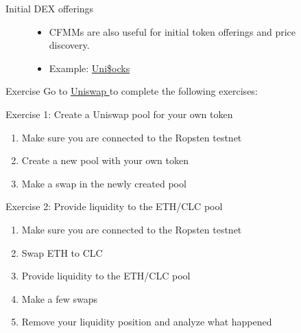 \documentclass[]{beamer}
\begin{document}
\begin{frame}{Initial DEX offerings}

	\begin{figure}
		\begin{minipage}[c]{0.3\textwidth}
			
		\end{minipage}
		\hfill
		\begin{minipage}[c]{0.5\textwidth}
			\begin{itemize}
				\item CFMMs are also useful for initial token offerings and price discovery.
				\item Example: \href{https://unisocks.exchange/}{Uni\$ocks} \link
			\end{itemize}
		\end{minipage}
	\end{figure}

\end{frame}


\begin{frame}{Exercise}
	Go to \href{https://app.uniswap.org/}{Uniswap \link} to complete the following exercises:
	\vspace{.5cm}

	\begin{exercise}{Exercise 1: Create a Uniswap pool for your own token}
		\begin{enumerate}
			\item Make sure you are connected to the Ropsten testnet
			\item Create a new pool with your own token
			\item Make a swap in the newly created pool
		\end{enumerate}
	\end{exercise}
	\vspace{.5cm}
	\begin{exercise}{Exercise 2: Provide liquidity to the ETH/CLC pool}
		\begin{enumerate}
			\item Make sure you are connected to the Ropsten testnet
			\item Swap ETH to CLC
			\item Provide liquidity to the ETH/CLC pool
			\item Make a few swaps
			\item Remove your liquidity position and analyze what happened
		\end{enumerate}
	\end{exercise}
\end{frame}
\end{document}
